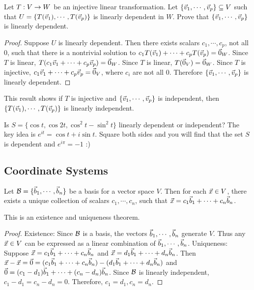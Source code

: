 \documentclass[10pt,a4paper]{article}
\begin{document}
\begin{example}
	Let $T:V\rightarrow W$ be an injective linear transformation. Let $\{\vec{v}_1,\cdots,\vec{v}_p\} \subseteq V$ such that $U = \{T(\vec{v}_1),\cdots,T(\vec{v}_p)\}$ is linearly dependent in $W$. Prove that $\{\vec{v}_1,\cdots,\vec{v}_p\}$ is linearly dependent.
\end{example}
\begin{proof}
	Suppose $U$ is linearly dependent. Then there exists scalars $c_1,\cdots,c_p$, not all 0, such that there is a nontrivial solution to $c_1 T(\vec{v}_1) + \cdots + c_p T(\vec{v}_p) = \vec{0}_W$. Since $T$ is linear, $T(c_1 \vec{v}_1 + \cdots + c_p \vec{v}_p) = \vec{0}_W$.
		Since $T$ is linear, $T(\vec{0}_V) = \vec{0}_W$.
	Since $T$ is injective, $c_1\vec{v}_1 + \cdots + c_p \vec{v}_p = \vec{0}_V$, where $c_i$ are not all 0. Therefore $\{\vec{v}_1,\cdots,\vec{v}_p\}$ is linearly dependent.
\end{proof}
\begin{remark}
	This result shows if $T$ is injective and $\{\vec{v}_1,\cdots,\vec{v}_p\}$ is independent, then $\{T(\vec{v}_1),\cdots,T(\vec{v}_p)\}$ is linearly independent.
\end{remark}

\begin{example}
	Is $S=\{\cos{t},\cos{2t},\cos^2{t} - \sin^2{t}\}$ linearly dependent or independent?
	The key idea is $e^{i t} = \cos{t} + i \sin{t}$. Square both sides and you will find that the set $S$ is dependent and $e^{i \pi} = -1$ :)
\end{example}

\subsection{Coordinate Systems}
\begin{theorem}
	Let $\mathcal{B} = \{\vec{b}_1,\cdots,\vec{b}_n\}$ be a basis for a vector space $V$. Then for each $\vec{x}\in V$, there exists a unique collection of scalars $c_1,\cdots,c_n$, such that $\vec{x} = c_1 \vec{b}_1 + \cdots + c_n \vec{b}_n$.
\end{theorem}
\begin{note}
	This is an existence and uniqueness theorem.
\end{note}
\begin{proof}
	Existence: Since $\mathcal{B}$ is a basis, the vectors $\vec{b}_1, \cdots,\vec{b}_n$ generate $V$. Thus any $\vec{x}\in V$ can be expressed as a linear combination of $\vec{b}_1,\cdots,\vec{b}_n$.
	Uniqueness: Suppose $\vec{x} = c_1 \vec{b}_1 + \cdots + c_n \vec{b}_n$ and $\vec{x} = d_1 \vec{b}_1 + \cdots + d_n \vec{b}_n$. Then $\vec{x} - \vec{x} = \vec{0} = (c_1 \vec{b}_1 + \cdots + c_n \vec{b}_n) - (d_1 \vec{b}_1 + \cdots + d_n \vec{b}_n)$ and $\vec{0} = (c_1 - d_1) \vec{b}_1 + \cdots + (c_n - d_n) \vec{b}_n$. Since $\mathcal{B}$ is linearly independent, $c_1 - d_1 = c_n - d_n = 0$. Therefore, $c_1 = d_1, c_n = d_n$.
\end{proof}
\end{document}
